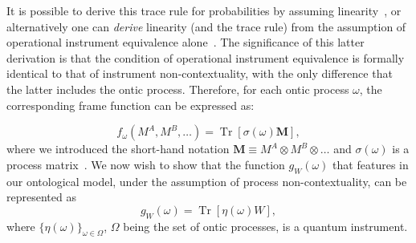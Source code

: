 \documentclass[a4paper,onecolumn,11pt,accepted=2018-05-04]{quantumarticle}
\DeclareMathOperator{\tr}{Tr}
\begin{document}
It is possible to derive this trace rule for probabilities by assuming linearity~\cite{oreshkov12}, or alternatively one can \emph{derive} linearity (and the trace rule) from the assumption of operational instrument equivalence alone~\cite{shrapnel2017}. The significance of this latter derivation is that the condition of operational instrument equivalence is formally identical to that of instrument non-contextuality, with the only difference that the latter includes the ontic process. Therefore,
for each ontic process $\omega$, the corresponding frame function can be expressed as:

\begin{equation}\label{framenoncontextual}
f_\omega(M^A, M^B,\dots) = \tr\left[ \sigma(\omega) \mathbf{M}\right],
\end{equation}
where we introduced the short-hand notation $\mathbf{M} \equiv M^A \otimes M^B\otimes\dots$ and $\sigma(\omega)$ is a process matrix~\cite{shrapnel2017}. We now wish to show that the function $g_W(\omega)$ that features in our ontological model, under the assumption of process non-contextuality, can be represented as
\begin{equation}
\label{dualframe}
g_W(\omega) = \tr \left[\eta(\omega)W\right],
\end{equation}
where $\{\eta(\omega)\}_{\omega \in \Omega}$, $\Omega$ being the set of ontic processes, is a quantum instrument. 
\end{document}
